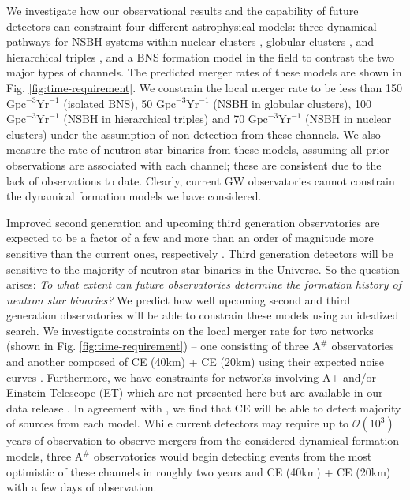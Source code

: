 We investigate how our observational results and the capability of future detectors can constraint four different astrophysical models: three dynamical pathways for NSBH systems within nuclear clusters \cite{Fragione:2018yrb}, globular clusters \cite{Sedda:2020wzl}, and hierarchical triples \cite{Trani:2021tan}, and a BNS formation model in the field \cite{Belczynski:2017mqx} to contrast the two major types of channels. The predicted merger rates of these models are shown in Fig. \ref{fig:time-requirement}. We constrain the local merger rate to be less than 150 $\text{Gpc}^{-3}\text{Yr}^{-1}$ (isolated BNS), 50 $\text{Gpc}^{-3}\text{Yr}^{-1}$ (NSBH in globular clusters), 100 $\text{Gpc}^{-3}\text{Yr}^{-1}$ (NSBH in hierarchical triples) and 70 $\text{Gpc}^{-3}\text{Yr}^{-1}$ (NSBH in nuclear clusters) under the assumption of non-detection from these channels. We also measure the rate of neutron star binaries from these models, assuming all prior observations are associated with each channel; these are consistent due to the lack of observations to date. Clearly, current GW observatories cannot constrain the dynamical formation models we have considered. 

Improved second generation and upcoming third generation observatories are expected to be a factor of a few and  more than an order of magnitude more sensitive than the current ones, respectively \cite{Asharp_sensitivity, CE_sensitivity}. Third generation detectors will be sensitive to the majority of neutron star binaries in the Universe. So the question arises: \textit{ To what extent can future observatories determine the formation history of neutron star binaries?} We predict how well upcoming second and third generation observatories will be able to constrain these models using an idealized search. We investigate constraints on the local merger rate for two networks (shown in Fig. \ref{fig:time-requirement}) -- one consisting of three $\text{A}^{\#}$ observatories and another composed of CE (40km) + CE (20km) using their expected noise curves \cite{Asharp_sensitivity, CE_sensitivity}. Furthermore, we have constraints for networks involving A+ and/or Einstein Telescope (ET) which are not presented here but are available in our data release \cite{github}. In agreement with \cite{Baibhav:2019gxm}, we find that CE will be able to detect majority of sources from each model. While current detectors may require up to $\mathcal{O}(10^3)$ years of observation to observe mergers from the considered dynamical formation models, three $\text{A}^{\#}$ observatories would begin detecting events from the most optimistic of these channels in roughly two years and CE (40km) + CE (20km) with a few days of observation.  
 
